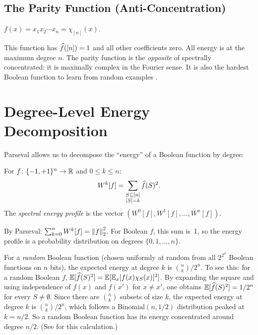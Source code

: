 \subsection{The Parity Function (Anti-Concentration)}\label{sec:parity-ex}

\begin{example}[Parity]\label{ex:parity}
$f(x) = x_1 x_2 \cdots x_n = \chi_{[n]}(x)$.

This function has $\widehat{f}([n]) = 1$ and all other coefficients zero. All
energy is at the maximum degree $n$. The parity function is the
\emph{opposite} of spectrally concentrated: it is maximally complex in the
Fourier sense. It is also the hardest Boolean function to learn from
random examples \citep{linial1993constant}.
\end{example}


\section{Degree-Level Energy Decomposition}\label{sec:energy-levels}

Parseval allows us to decompose the ``energy'' of a Boolean function by
degree:

\begin{definition}\label{def:energy-level}
For $f \colon \{-1,+1\}^n \to \mathbb{R}$ and $0 \leq k \leq n$:
\[
  W^k[f] = \sum_{\substack{S \subseteq [n] \\ |S| = k}} \widehat{f}(S)^2.
\]
The \emph{spectral energy profile} is the vector $(W^0[f], W^1[f], \ldots, W^n[f])$.
\end{definition}

By Parseval: $\sum_{k=0}^n W^k[f] = \left\| f \right\|_2^2$. For Boolean $f$,
this sum is~1, so the energy profile is a probability distribution on
degrees $\{0, 1, \ldots, n\}$.

For a \emph{random} Boolean function (chosen uniformly at random from all
$2^{2^n}$ Boolean functions on $n$ bits), the expected energy at degree
$k$ is $\binom{n}{k} / 2^n$.  To see this: for a random Boolean $f$,
$\mathbb{E}[\widehat{f}(S)^2] = \mathbb{E}[\mathbb{E}_x[f(x)\chi_S(x)]^2]$. By expanding the square
and using independence of $f(x)$ and $f(x')$ for $x \neq x'$, one
obtains $\mathbb{E}[\widehat{f}(S)^2] = 1/2^n$ for every $S \neq \emptyset$. Since
there are $\binom{n}{k}$ subsets of size $k$, the expected energy at
degree $k$ is $\binom{n}{k}/2^n$, which follows a
$\text{Binomial}(n, 1/2)$ distribution peaked at $k = n/2$.
So a random Boolean function has its energy concentrated around degree
$n/2$. (See \citealp[Exercise~1.19]{odonnell2014analysis} for this
calculation.)

